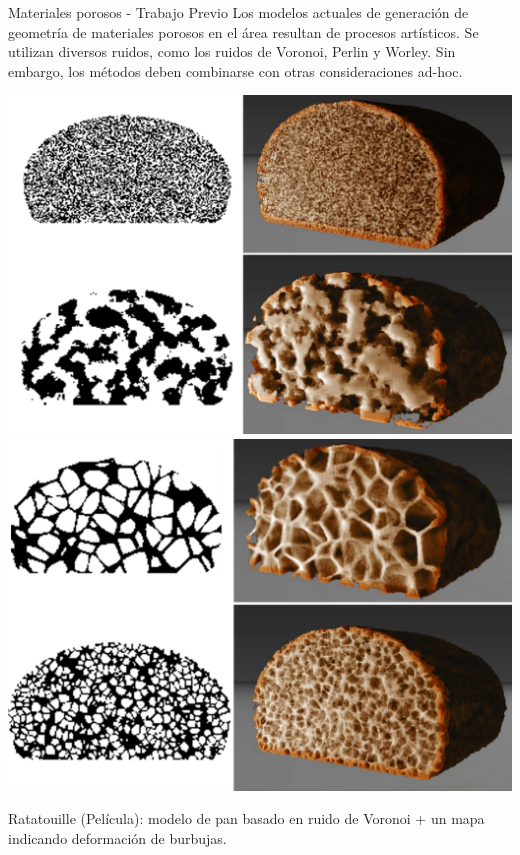 \documentclass[spanish]{beamer}
\begin{document}
\begin{frame}{Materiales porosos - Trabajo Previo}
Los modelos actuales de generación de geometría de materiales porosos en el área resultan de procesos artísticos.
Se utilizan diversos ruidos, como los ruidos de Voronoi, Perlin y Worley. Sin embargo, los métodos deben combinarse con otras consideraciones ad-hoc.

\includegraphics[scale = 0.2]{../figures/Fig8}
\includegraphics[scale = 0.2]{../figures/Fig9CAVW}

Ratatouille (Película): modelo de pan basado en ruido de Voronoi + un mapa indicando deformación de burbujas.
\end{frame}
\end{document}
